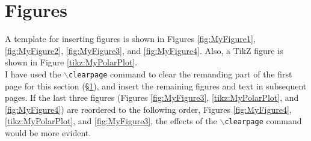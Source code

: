 









\chapter{Figures}
\label{chp:Figures}

A template for inserting figures is shown in Figures \ref{fig:MyFigure1}, \ref{fig:MyFigure2}, \ref{fig:MyFigure3}, and \ref{fig:MyFigure4}. Also, a TikZ figure is shown in Figure \ref{tikz:MyPolarPlot}. \\

I have used the {\tt $\backslash$clearpage} command to clear the remanding part of the first page for this section (\S\ref{chp:Figures}), and insert the remaining figures and text in subsequent pages. If the last three figures (Figures  \ref{fig:MyFigure3}, \ref{tikz:MyPolarPlot}, and \ref{fig:MyFigure4}) are reordered to the following order, Figures  \ref{fig:MyFigure4}, \ref{tikz:MyPolarPlot}, and \ref{fig:MyFigure3}, the effects of the {\tt $\backslash$clearpage} command would be more evident.


